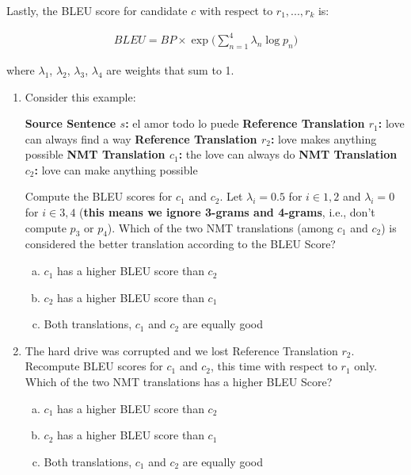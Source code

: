 \begin{enumerate}[1.]
Lastly, the BLEU score for candidate $c$ with respect to $r_1,...,r_k$ is:

\begin{align}
BLEU = BP \times \exp \Big( \sum_{n=1}^4 \lambda_n \log p_n \Big)
\end{align}

where $\lambda_1$, $\lambda_2$, $\lambda_3$, $\lambda_4$ are weights that sum to 1.

\begin{enumerate}[4a.]
\item {}
Consider this example:

{\bf Source Sentence $s$:} el amor todo lo puede 
{\bf Reference Translation $r_1$:} love can always find a way
{\bf Reference Translation $r_2$:} love makes anything possible
{\bf NMT Translation $c_1$:} the love can always do
{\bf NMT Translation $c_2$:} love can make anything possible

Compute the BLEU scores for $c_1$ and $c_2$. Let $\lambda_i=0.5$ for $i \in {1 ,2}$ and $\lambda_i=0$ for $i \in {3 ,4}$ ({\bf this means we ignore 3-grams and 4-grams}, i.e., don't compute $p_3$ or $p_4$). Which of the two NMT translations (among $c_1$ and $c_2$) is considered the better translation according to the BLEU Score?

\begin{enumerate}[(a)]
\item $c_1$ has a higher BLEU score than $c_2$
\item $c_2$ has a higher BLEU score than $c_1$
\item Both translations, $c_1$ and $c_2$ are equally good
\end{enumerate}


\item {}

The hard drive was corrupted and we lost Reference Translation $r_2$. Recompute BLEU scores for $c_1$ and $c_2$, this time with respect to $r_1$ only. Which of the two NMT translations has a higher BLEU Score?

\begin{enumerate}[(a)]
\item $c_1$ has a higher BLEU score than $c_2$
\item $c_2$ has a higher BLEU score than $c_1$
\item Both translations, $c_1$ and $c_2$ are equally good
\end{enumerate}


\end{enumerate}
\end{enumerate}
